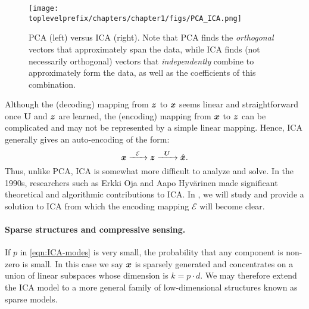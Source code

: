 \documentclass[../../book-main.tex]{subfiles}
\begin{document}
\begin{figure}
    \centering
    \texttt{[image: \\toplevelprefix/chapters/chapter1/figs/PCA\_ICA.png]}
    \caption{PCA (left) versus ICA (right). Note that PCA finds the \textit{orthogonal} vectors that approximately span the data, while ICA finds (not necessarily orthogonal) vectors that \textit{independently} combine to approximately form the data, as well as the coefficients of this combination.}
    \label{fig:ICA-PCA}
\end{figure}

Although the (decoding) mapping from $\bm{z}$ to $\bm{x}$ seems linear and straightforward once $\boldsymbol{U}$ and $\bm{z}$ are learned, the (encoding) mapping from $\bm{x}$ to $\bm{z}$ can be complicated and may not be represented by a simple linear mapping. Hence, ICA generally gives an auto-encoding of the form:
\begin{equation}
    \bm{x}   \xrightarrow{\hspace{2mm} \mathcal{E}\hspace{2mm}} \bm{z}  \xrightarrow{\hspace{2mm} \boldsymbol{U} \hspace{2mm}} \hat {\bm{x}}.
       \label{eqn:auto-encoding-ICA}
\end{equation}
Thus, unlike PCA, ICA is somewhat more difficult to analyze and solve. In the 1990s, researchers such as Erkki Oja and Aapo Hyv\"{a}rinen \cite{hyvarinen-1997,Hyvrinen-2000} made significant theoretical and algorithmic contributions to ICA. In , we will study and provide a solution to ICA from which the encoding mapping $\mathcal{E}$ will become clear.


\paragraph{Sparse structures and compressive sensing.}
If $p$ in \eqref{eqn:ICA-modes} is very small, the probability that any component is non-zero is small. In this case we say $\bm{x}$ is sparsely generated and concentrates on a union of linear subspaces whose dimension is $k = p \cdot d$. We may therefore extend the ICA model to a more general family of low-dimensional structures known as sparse models.
\end{document}
